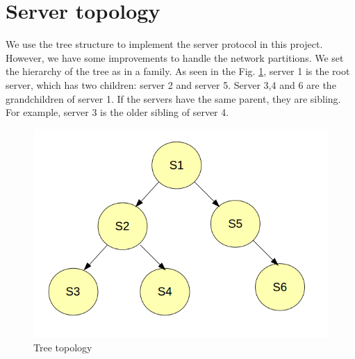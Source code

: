 \documentclass[10pt,twocolumn]{article}
\begin{document}
\section{Server topology}
We use the tree structure to implement the server protocol in this project. However, we have some improvements to handle the network partitions. We set the hierarchy of the tree as in a family. As seen in the Fig. \ref{topo}, server 1 is the root server, which has two children: server 2 and server 5. Server 3,4 and 6 are the grandchildren of server 1. If the servers have the same parent, they are sibling. For example, server 3 is the older sibling of server 4. 
 



\begin{figure}[h!]
\begin{center}
\includegraphics[scale=0.4]{full_topo}
\caption{Tree topology}
\label{topo}	
\end{center}
\end{figure}
\end{document}
